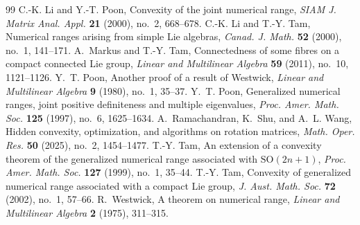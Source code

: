 \documentclass[11pt,reqno]{amsart}
\theoremstyle{remark}
\begin{document}
\begin{thebibliography}{99}
C.-K. Li and Y.-T. Poon, Convexity of the joint numerical range,
\emph{SIAM J. Matrix Anal. Appl.} \textbf{21} (2000), no.~2, 668--678.
C.-K. Li and T.-Y. Tam, Numerical ranges arising from simple Lie
algebras, \emph{Canad. J. Math.} \textbf{52} (2000), no.~1, 141--171.
A.~Markus and T.-Y. Tam, Connectedness of some fibres on a compact
connected Lie group, \emph{Linear and Multilinear Algebra} \textbf{59}
(2011), no.~10, 1121--1126.
Y.~T. Poon, Another proof of a result of Westwick,
\emph{Linear and Multilinear Algebra} \textbf{9} (1980), no.~1, 35--37.
Y.~T. Poon, Generalized numerical ranges, joint positive definiteness
and multiple eigenvalues, \emph{Proc. Amer. Math. Soc.} \textbf{125}
(1997), no.~6, 1625--1634.
A.~Ramachandran, K.~Shu, and A.~L. Wang, Hidden convexity,
optimization, and algorithms on rotation matrices,
\emph{Math. Oper. Res.} \textbf{50} (2025), no.~2, 1454--1477.
T.-Y. Tam, An extension of a convexity theorem of the generalized
numerical range associated with $\mathrm{SO}(2n+1)$,
\emph{Proc. Amer. Math. Soc.} \textbf{127} (1999), no.~1, 35--44.
T.-Y. Tam, Convexity of generalized numerical range associated with a compact Lie group,
\emph{J. Aust. Math. Soc.} \textbf{72} (2002), no.~1, 57--66.
R.~Westwick, A theorem on numerical range,
\emph{Linear and Multilinear Algebra} \textbf{2} (1975), 311--315.
\end{thebibliography}
\end{document}
